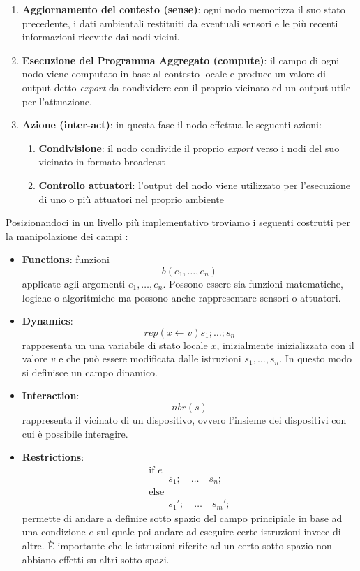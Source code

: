 \documentclass[12pt,a4paper,openright,twoside]{book}
\begin{document}
\begin{enumerate}
    \item \textbf{Aggiornamento del contesto (sense)}: ogni nodo memorizza il suo stato precedente, i dati ambientali restituiti da eventuali sensori e le più recenti informazioni ricevute dai nodi vicini.
    \item \textbf{Esecuzione del Programma Aggregato (compute)}: il campo di ogni nodo viene computato in base al contesto locale e produce un valore di output detto \textit{export} da condividere con il proprio vicinato ed un output utile per l'attuazione.
    \item \textbf{Azione (inter-act)}: in questa fase il nodo effettua le seguenti azioni:
    \begin{enumerate}
        \item \textbf{Condivisione}: il nodo condivide il proprio \textit{export} verso i nodi del suo vicinato in formato broadcast
        \item \textbf{Controllo attuatori}: l'output del nodo viene 
        utilizzato per l'esecuzione di uno o più attuatori nel proprio ambiente
    \end{enumerate}
\end{enumerate}


Posizionandoci in un livello più implementativo troviamo i seguenti costrutti per la manipolazione dei campi \cite{Pianini2017}: 

\begin{itemize}
    \item \textbf{Functions}: funzioni $$ b(e_1,\dots,e_n) $$ applicate agli argomenti $e_1,\dots,e_n$. Possono essere sia funzioni matematiche, logiche o algoritmiche ma possono anche rappresentare sensori o attuatori.
    \item \textbf{Dynamics}: $$ rep(x \leftarrow v){s_1;\dots;s_n} $$ rappresenta un una variabile di stato locale $x$, inizialmente inizializzata con il valore $v$ e che può essere modificata dalle istruzioni $s_1,\dots,s_n$. In questo modo si definisce un campo dinamico.
    \item \textbf{Interaction}: $$ nbr(s) $$ rappresenta il vicinato di un dispositivo, ovvero l'insieme dei dispositivi con cui è possibile interagire.
    \item \textbf{Restrictions}: $$
        \begin{array}{l}
        \text{if } e \\
        \qquad s_1; \quad \dots \quad s_n; \\
        \text{else} \\
        \qquad s_1'; \quad \dots \quad s_m';
        \end{array}
    $$
    permette di andare a definire sotto spazio del campo principiale in base ad una condizione $e$ sul quale poi andare ad eseguire certe istruzioni invece di altre. È importante che le istruzioni riferite ad un certo sotto spazio non abbiano effetti su altri sotto spazi.
\end{itemize}
\end{document}

